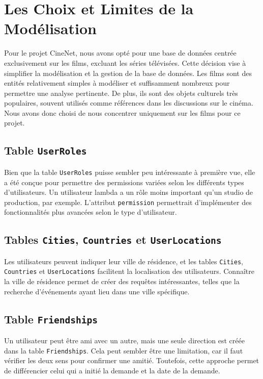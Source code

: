 \section*{Les Choix et Limites de la Modélisation}

Pour le projet CineNet, nous avons opté pour une base de données centrée exclusivement sur les films, excluant les séries télévisées. Cette décision vise à simplifier la modélisation et la gestion de la base de données. Les films sont des entités relativement simples à modéliser et suffisamment nombreux pour permettre une analyse pertinente. De plus, ils sont des objets culturels très populaires, souvent utilisés comme références dans les discussions sur le cinéma. Nous avons donc choisi de nous concentrer uniquement sur les films pour ce projet.

\subsection*{Table \texttt{UserRoles}}

Bien que la table \texttt{UserRoles} puisse sembler peu intéressante à première vue, elle a été conçue pour permettre des permissions variées selon les différents types d'utilisateurs. Un utilisateur lambda a un rôle moins important qu'un studio de production, par exemple. L'attribut \texttt{permission} permettrait d'implémenter des fonctionnalités plus avancées selon le type d'utilisateur.

\subsection*{Tables \texttt{Cities}, \texttt{Countries} et \texttt{UserLocations}}

Les utilisateurs peuvent indiquer leur ville de résidence, et les tables \texttt{Cities}, \texttt{Countries} et \texttt{UserLocations} facilitent la localisation des utilisateurs. Connaître la ville de résidence permet de créer des requêtes intéressantes, telles que la recherche d'événements ayant lieu dans une ville spécifique.

\subsection*{Table \texttt{Friendships}}

Un utilisateur peut être ami avec un autre, mais une seule direction est créée dans la table \texttt{Friendships}. Cela peut sembler être une limitation, car il faut vérifier les deux sens pour confirmer une amitié. Toutefois, cette approche permet de différencier celui qui a initié la demande et la date de la demande.

